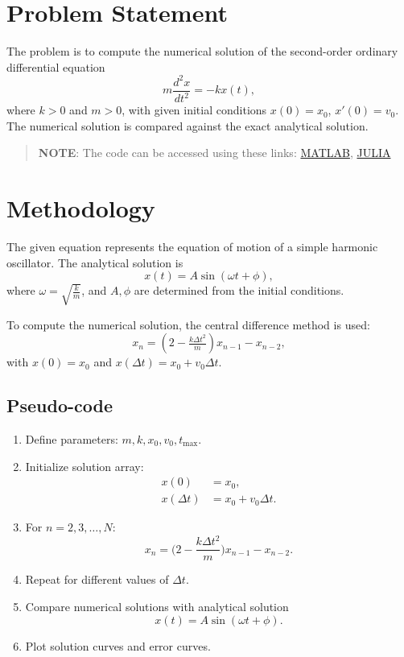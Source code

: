\section*{Problem Statement}
The problem is to compute the numerical solution of the second-order ordinary differential equation
\[
    m \frac{d^2x}{dt^2} = -k x(t),
\]
where $k > 0$ and $m > 0$, with given initial conditions $x(0) = x_0$, $x'(0) = v_0$. The numerical solution is compared against the exact analytical solution.

\begin{quote}
  \textbf{NOTE}: The code can be accessed using these links: \href{https://raw.githubusercontent.com/HavokSahil/computational-techniques-assignments/refs/heads/main/assignment0/a1_harmonic_osc.m}{MATLAB}, \href{https://raw.githubusercontent.com/HavokSahil/computational-techniques-assignments/refs/heads/main/assignment0/a1_harmonic_osc.jl}{JULIA}
\end{quote}

\section*{Methodology}
The given equation represents the equation of motion of a simple harmonic oscillator. The analytical solution is
\[
    x(t) = A \sin(\omega t + \phi),
\]
where $\omega = \sqrt{\tfrac{k}{m}}$, and $A, \phi$ are determined from the initial conditions.

To compute the numerical solution, the central difference method is used:
\[
    x_{n} = (2 - \tfrac{k \Delta t^2}{m}) x_{n-1} - x_{n-2},
\]
with $x(0) = x_0$ and $x(\Delta t) = x_0 + v_0 \Delta t$.

\subsection*{Pseudo-code}
\begin{enumerate}
    \item Define parameters: $m, k, x_0, v_0, t_{\max}$.
    \item Initialize solution array:
    \begin{align*}
        x(0) &= x_0, \\
        x(\Delta t) &= x_0 + v_0 \Delta t.
    \end{align*}
    \item For $n = 2,3,\dots,N$:
    \[
        x_n = \bigg(2 - \frac{k \Delta t^2}{m}\bigg)x_{n-1} - x_{n-2}.
    \]
    \item Repeat for different values of $\Delta t$.
    \item Compare numerical solutions with analytical solution
    \[
        x(t) = A \sin(\omega t + \phi).
    \]
    \item Plot solution curves and error curves.
\end{enumerate}

